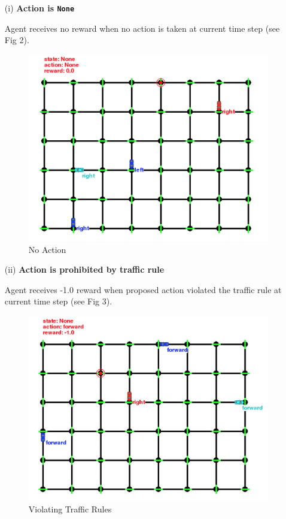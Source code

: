 \documentclass[12pt,a4paper]{article}
\begin{document}
\begin{enumerate}
\item[(i)]
\textbf{Action is \texttt{None}}

Agent receives no reward when no action is taken at current time step (see Fig 2).
\begin{figure}[H]
\caption{No Action}
\includegraphics[width=12cm]{fig2.png}
\centering
\end{figure}

\item[(ii)]
\textbf{Action is prohibited by traffic rule}

Agent receives -1.0 reward when proposed action violated the traffic rule at current time step (see Fig 3).
\begin{figure}[H]
\caption{Violating Traffic Rules}
\includegraphics[width=12cm]{fig3.png}
\centering
\end{figure}


\end{enumerate}
\end{document}

